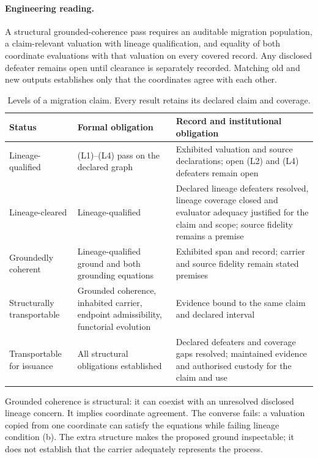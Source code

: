 \documentclass[smallextended,envcountsect,envcountsame,natbib]{svjour3}
\begin{document}
\paragraph{Engineering reading.} A structural grounded-coherence pass requires an auditable migration population, a claim-relevant valuation with lineage qualification, and equality of both coordinate evaluations with that valuation on every covered record. Any disclosed defeater remains open until clearance is separately recorded. Matching old and new outputs establishes only that the coordinates agree with each other.

\begin{table}[htbp]
\centering\small
\caption{Levels of a migration claim. Every result retains its declared claim and coverage.}
\label{ex:tab:claim-levels}
\begin{tabularx}{\textwidth}{@{}p{3.1cm}LL@{}}
\toprule
Status & Formal obligation & Record and institutional obligation \\
\midrule
Lineage-qualified & (L1)--(L4) pass on the declared graph & Exhibited valuation and source declarations; open (L2) and (L4) defeaters remain open \\
Lineage-cleared & Lineage-qualified & Declared lineage defeaters resolved, lineage coverage closed and evaluator adequacy justified for the claim and scope; source fidelity remains a premise \\
Groundedly coherent & Lineage-qualified ground and both grounding equations & Exhibited span and record; carrier and source fidelity remain stated premises \\
Structurally transportable & Grounded coherence, inhabited carrier, endpoint admissibility, functorial evolution & Evidence bound to the same claim and declared interval \\
Transportable for issuance & All structural obligations established & Declared defeaters and coverage gaps resolved; maintained evidence and authorised custody for the claim and use \\
\bottomrule
\end{tabularx}
\end{table}

Grounded coherence is structural: it can coexist with an unresolved disclosed lineage concern. It implies coordinate agreement. The converse fails: a valuation copied from one coordinate can satisfy the equations while failing lineage condition (b). The extra structure makes the proposed ground inspectable; it does not establish that the carrier adequately represents the process.
\end{document}
